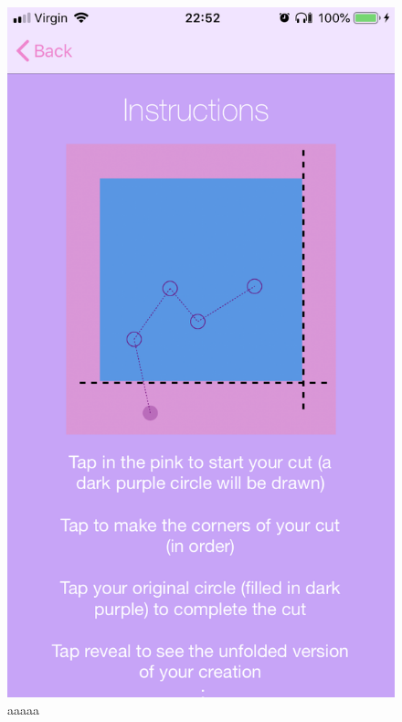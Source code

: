 \documentclass[11pt]{article}
\begin{document}
                \paragraph{}
               \begin{figure}[!ht]
                                \begin{minipage}{0.45\textwidth}
                                    \centering \includegraphics[width=0.7\linewidth]{KiriZen/instructionsCreate.png}
                                    \caption{aaaaa}
                                    \label{fig:kiriZen-instructionsCreate}
                                \end{minipage}\hfill
                                \begin{minipage}{0.45\textwidth}
                                    \centering

\end{minipage}
\end{figure}
\end{document}
